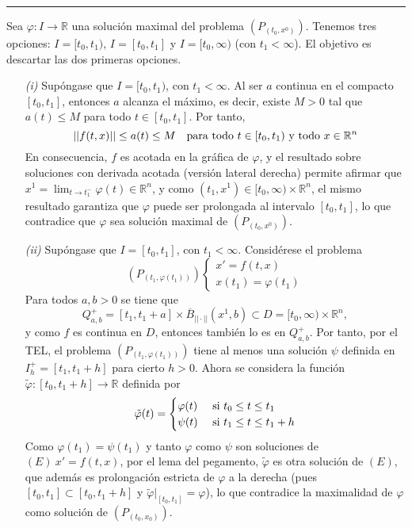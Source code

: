 \documentclass[11pt]{report}
\newcommand{\R}{\mathbb R}
\begin{document}
\vspace{4mm}

\hrule

\vspace{4mm}

Sea $\varphi \colon I \to \R$ una solución maximal del problema $(P_{(t_0,x^0)})$. Tenemos tres opciones: $I = [t_0,t_1)$, $I = [t_0,t_1]$ y $I = [t_0,\infty)$ (con $t_1 < \infty$). El objetivo es descartar las dos primeras opciones.

\begin{itemize}
    \item[\textit{(i)}] Supóngase que $I = [t_0,t_1)$, con $t_1 < \infty$. Al ser $a$ continua en el compacto $[t_0,t_1]$, entonces $a$ alcanza el máximo, es decir, existe $M >0$ tal que $a(t) \leq M$ para todo $t \in [t_0,t_1]$. Por tanto,
    \[||f(t,x)|| \leq a(t) \leq M \quad \textup{para todo } t \in [t_0,t_1) \textup{ y todo } x \in \R^n\]
    En consecuencia, $f$ es acotada en la gráfica de $\varphi$, y el resultado sobre soluciones con derivada acotada (versión lateral derecha) permite afirmar que $x^1 = \lim_{t \to t_1^-} \varphi(t) \in \R^n$, y como $(t_1,x^1) \in [t_0,\infty) \times \R^n$, el mismo resultado garantiza que $\varphi$ puede ser prolongada al intervalo $[t_0,t_1]$, lo que contradice que $\varphi$ sea solución maximal de $(P_{(t_0,x^0)})$.
    \item[\textit{(ii)}] Supóngase que $I = [t_0,t_1]$, con $t_1 < \infty$. Considérese el problema
    \[(P_{(t_1,\varphi(t_1))}) \begin{cases}
        x'=f(t,x) \\
        x(t_1)=\varphi(t_1)
    \end{cases}\]
    Para todos $a,b > 0$ se tiene que
    \[Q_{a,b}^+ = [t_1,t_1+a] \times \overline{B}_{||\cdot ||}(x^1,b) \subset D= [t_0,\infty) \times \R^n,\]
    y como $f$ es continua en $D$, entonces también lo es en $Q_{a,b}^+$. Por tanto, por el TEL, el problema $(P_{(t_1,\varphi(t_1))})$ tiene al menos una solución $\psi$ definida en $I_h^+ = [t_1,t_1+h]$ para cierto $h > 0$. Ahora se considera la función $\tilde{\varphi} \colon [t_0,t_1+h] \to \R$ definida por
    \[\tilde{\varphi}(t) = \begin{cases}
        \varphi(t) & $ si $ t_0 \leq t \leq t_1 \\
        \psi(t) & $ si $ t_1 \leq t \leq t_1+h
    \end{cases}\]
    Como $\varphi(t_1)=\psi(t_1)$ y tanto $\varphi$ como $\psi$ son soluciones de $(E) \ x'=f(t,x)$, por el lema del pegamento, $\tilde{\varphi}$ es otra solución de $(E)$, que además es prolongación estricta de $\varphi$ a la derecha (pues $[t_0,t_1] \subset [t_0,t_1+h]$ y $\tilde{\varphi} |_{[t_0,t_1]} = \varphi$), lo que contradice la maximalidad de $\varphi$ como solución de ${(P_{(t_0,x_0)})}$.
\end{itemize}
\end{document}
